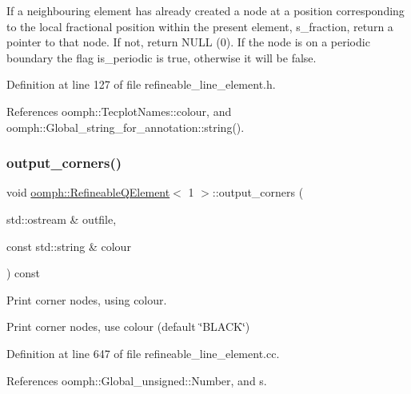 If a neighbouring element has already created a node at a position corresponding to the local fractional position within the present element, s\+\_\+fraction, return a pointer to that node. If not, return N\+U\+LL (0). If the node is on a periodic boundary the flag is\+\_\+periodic is true, otherwise it will be false. 



Definition at line 127 of file refineable\+\_\+line\+\_\+element.\+h.



References oomph\+::\+Tecplot\+Names\+::colour, and oomph\+::\+Global\+\_\+string\+\_\+for\+\_\+annotation\+::string().

\mbox{\label{classoomph_1_1RefineableQElement_3_011_01_4_aa1ec4cdf297f9061f41c6e6cccb087e9}} 
\subsubsection{\texorpdfstring{output\+\_\+corners()}{output\_corners()}}
{\footnotesize\ttfamily void \hyperlink{classoomph_1_1RefineableQElement}{oomph\+::\+Refineable\+Q\+Element}$<$ 1 $>$\+::output\+\_\+corners (\begin{DoxyParamCaption}\item[{std\+::ostream \&}]{outfile,  }\item[{const std\+::string \&}]{colour }\end{DoxyParamCaption}) const}



Print corner nodes, using colour. 

Print corner nodes, use colour (default \char`\"{}\+B\+L\+A\+C\+K\char`\"{}) 

Definition at line 647 of file refineable\+\_\+line\+\_\+element.\+cc.



References oomph\+::\+Global\+\_\+unsigned\+::\+Number, and s.

\mbox{\label{classoomph_1_1RefineableQElement_3_011_01_4_a2c57e01f88f507f63a55ef005f11d2ce}} 
